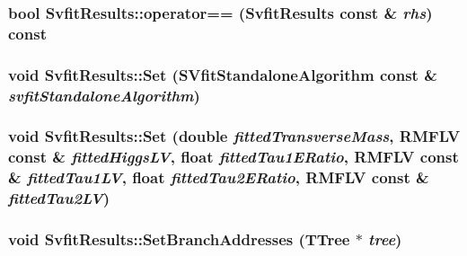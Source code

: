 \label{classSvfitResults_ad041804809054ef7c2646c60917ba4df}
\hypertarget{classSvfitResults_a574ed1daf1dbdc964579142882be0a8c}{
\subsubsection[{operator==}]{\setlength{\rightskip}{0pt plus 5cm}bool SvfitResults::operator== ({\bf SvfitResults} const \& {\em rhs}) const}}
\label{classSvfitResults_a574ed1daf1dbdc964579142882be0a8c}
\hypertarget{classSvfitResults_a65bd60c67619a8833287c6f86687cc27}{
\subsubsection[{Set}]{\setlength{\rightskip}{0pt plus 5cm}void SvfitResults::Set (SVfitStandaloneAlgorithm const \& {\em svfitStandaloneAlgorithm})}}
\label{classSvfitResults_a65bd60c67619a8833287c6f86687cc27}
\hypertarget{classSvfitResults_abc44ddb612f169968a7c53e254d15579}{
\subsubsection[{Set}]{\setlength{\rightskip}{0pt plus 5cm}void SvfitResults::Set (double {\em fittedTransverseMass}, \/  RMFLV const \& {\em fittedHiggsLV}, \/  float {\em fittedTau1ERatio}, \/  RMFLV const \& {\em fittedTau1LV}, \/  float {\em fittedTau2ERatio}, \/  RMFLV const \& {\em fittedTau2LV})}}
\label{classSvfitResults_abc44ddb612f169968a7c53e254d15579}
\hypertarget{classSvfitResults_aa81f0fc890b1d57d6e780c195dc8a956}{
\subsubsection[{SetBranchAddresses}]{\setlength{\rightskip}{0pt plus 5cm}void SvfitResults::SetBranchAddresses (TTree $\ast$ {\em tree})}}
\label{classSvfitResults_aa81f0fc890b1d57d6e780c195dc8a956}


